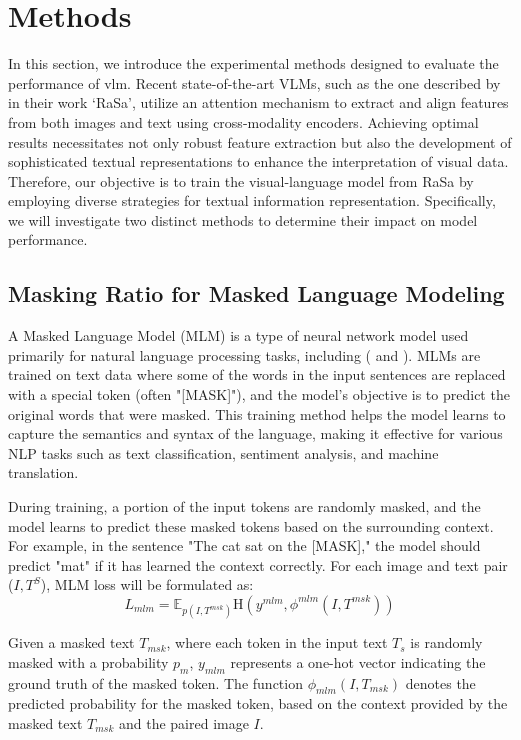 \section{Methods}
In this section, we introduce the experimental methods designed to evaluate the performance of \acrshort{vlm}. Recent state-of-the-art VLMs, such as the one described by \cite{Bai2023RaSaRA} in their work `RaSa', utilize an attention mechanism to extract and align features from both images and text using cross-modality encoders. Achieving optimal results necessitates not only robust feature extraction but also the development of sophisticated textual representations to enhance the interpretation of visual data. Therefore, our objective is to train the visual-language model from RaSa by employing diverse strategies for textual information representation. Specifically, we will investigate two distinct methods to determine their impact on model performance.


\subsection{Masking Ratio for Masked Language Modeling} 
A Masked Language Model (MLM) is a type of neural network model used primarily for natural language processing tasks, including (\cite{devlin2018bert} and \cite{Bai2023RaSaRA}). MLMs are trained on text data where some of the words in the input sentences are replaced with a special token (often "[MASK]"), and the model's objective is to predict the original words that were masked. This training method helps the model learns to capture the semantics and syntax of the language, making it effective for various NLP tasks such as text classification, sentiment analysis, and machine translation.

During training, a portion of the input tokens are randomly masked, and the model learns to predict these masked tokens based on the surrounding context. For example, in the sentence "The cat sat on the [MASK]," the model should predict "mat" if it has learned the context correctly. For each image and text pair ($I,T^S$), MLM loss will be formulated as:
\[
  L_{mlm} = \mathbb{E}_{p \left( I,T^{msk}\right) }\mathrm{H}\left(y^{mlm}, \phi^{mlm}\left(I,T^{msk}\right)\right)
\]

Given a masked text \( T_{msk} \), where each token in the input text \( T_s \) is randomly masked with a probability \( p_m \), \( y_{mlm} \) represents a one-hot vector indicating the ground truth of the masked token. The function \( \phi_{mlm}(I, T_{msk}) \) denotes the predicted probability for the masked token, based on the context provided by the masked text \( T_{msk} \) and the paired image \( I \).

